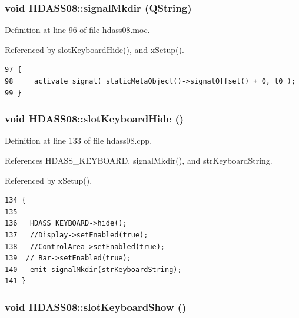 \subsubsection{\setlength{\rightskip}{0pt plus 5cm}void HDASS08::signal\-Mkdir (QString)\hspace{0.3cm}{\tt  [signal]}}\label{classHDASS08_HDASS08l0}




Definition at line 96 of file hdass08.moc.

Referenced by slot\-Keyboard\-Hide(), and x\-Setup().



\footnotesize\begin{verbatim}97 {
98     activate_signal( staticMetaObject()->signalOffset() + 0, t0 );
99 }
\end{verbatim}\normalsize 
{}
\subsubsection{\setlength{\rightskip}{0pt plus 5cm}void HDASS08::slot\-Keyboard\-Hide ()\hspace{0.3cm}{\tt  [slot]}}\label{classHDASS08_HDASS08i2}




Definition at line 133 of file hdass08.cpp.

References HDASS\_\-KEYBOARD, signal\-Mkdir(), and str\-Keyboard\-String.

Referenced by x\-Setup().



\footnotesize\begin{verbatim}134 {
135   
136   HDASS_KEYBOARD->hide();
137   //Display->setEnabled(true);
138   //ControlArea->setEnabled(true);
139  // Bar->setEnabled(true);
140   emit signalMkdir(strKeyboardString);
141 }
\end{verbatim}\normalsize 
{}
\subsubsection{\setlength{\rightskip}{0pt plus 5cm}void HDASS08::slot\-Keyboard\-Show ()\hspace{0.3cm}{\tt  [slot]}}\label{classHDASS08_HDASS08i1}




